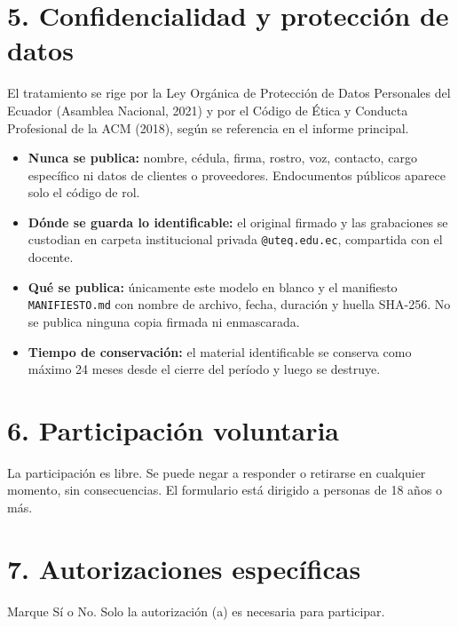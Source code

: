 \documentclass[11pt,a4paper]{article}
\begin{document}
\section*{5. Confidencialidad y protecci\'on de datos}
El tratamiento se rige por la Ley Org\'anica de Protecci\'on de Datos Personales del Ecuador (Asamblea Nacional, 2021) y por el C\'odigo de \'Etica y Conducta Profesional de la ACM (2018), seg\'un se referencia en el informe principal.
\begin{itemize}[leftmargin=16pt,itemsep=1pt]
\item \textbf{Nunca se publica:} nombre, c\'edula, firma, rostro, voz, contacto, cargo espec\'ifico ni datos de clientes o proveedores. Endocumentos p\'ublicos aparece solo el c\'odigo de rol.
\item \textbf{D\'onde se guarda lo identificable:} el original firmado y las grabaciones se custodian en carpeta institucional privada \texttt{@uteq.edu.ec}, compartida con el docente.
\item \textbf{Qu\'e se publica:} \'unicamente este modelo en blanco y el manifiesto \texttt{MANIFIESTO.md} con nombre de archivo, fecha, duraci\'on y huella SHA-256. No se publica ninguna copia firmada ni enmascarada.
\item \textbf{Tiempo de conservaci\'on:} el material identificable se conserva como m\'aximo 24 meses desde el cierre del per\'iodo y luego se destruye.
\end{itemize}

\section*{6. Participaci\'on voluntaria}
La participaci\'on es libre. Se puede negar a responder o retirarse en cualquier momento, sin consecuencias. El formulario est\'a dirigido a personas de 18 a\~nos o m\'as.

\section*{7. Autorizaciones espec\'ificas}
Marque S\'i o No. Solo la autorizaci\'on (a) es necesaria para participar.
\end{document}
